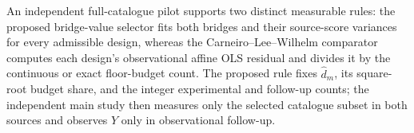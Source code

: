 An independent full-catalogue pilot supports two distinct measurable rules: the proposed bridge-value selector fits both bridges and their source-score variances for every admissible design, whereas the Carneiro--Lee--Wilhelm comparator computes each design's observational affine OLS residual and divides it by the continuous or exact floor-budget count.  The proposed rule fixes \(\widehat d_m\), its square-root budget share, and the integer experimental and follow-up counts; the independent main study then measures only the selected catalogue subset in both sources and observes \(Y\) only in observational follow-up.